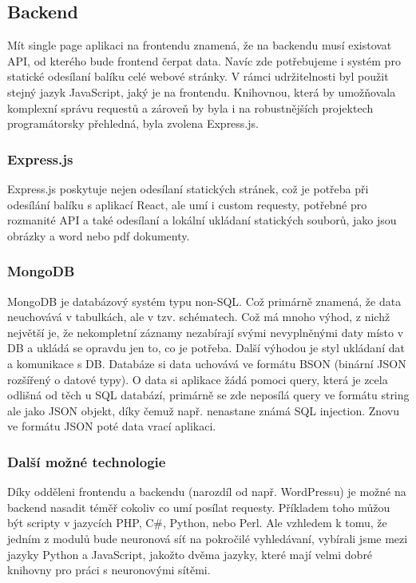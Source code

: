 \subsection{Backend}
Mít single page aplikaci na frontendu znamená, že na backendu musí existovat API,
od kterého bude frontend čerpat data.
Navíc zde potřebujeme i systém pro statické odesílaní balíku celé webové stránky.
V rámci udržitelnosti byl použit stejný jazyk JavaScript, jaký je na frontendu.
Knihovnou, která by umožňovala komplexní správu requestů a zároveň by byla
i na robustnějších projektech programátorsky přehledná, byla zvolena Express.js.

\subsubsection{Express.js}
Express.js poskytuje nejen odesílaní statických stránek,
což je potřeba při odesílání balíku s aplikací React, ale umí i
custom requesty, potřebné pro rozmanité API a také odesílaní a
lokální ukládaní statických souborů, jako jsou obrázky a word nebo pdf dokumenty.

\subsubsection{MongoDB}
MongoDB je databázový systém typu non-SQL.
Což primárně znamená, že data neuchovává v tabulkách, ale v tzv. schématech.
Což má mnoho výhod, z nichž největší je, že nekompletní záznamy nezabírají
svými nevyplněnými daty místo v DB a ukládá se opravdu jen to, co je potřeba.
Další výhodou je styl ukládaní dat a komunikace s DB.
Databáze si data uchovává ve formátu BSON (binární JSON rozšířený o datové typy).
O data si aplikace žádá pomoci query,
která je zcela odlišná od těch u SQL databází,
primárně se zde neposílá query ve formátu string ale jako JSON objekt,
díky čemuž např. nenastane známá SQL injection.
Znovu ve formátu JSON poté data vrací aplikaci.

\subsubsection{Další možné technologie}
Díky odděleni frontendu a backendu (narozdíl od např. WordPressu) je možné
na backend nasadit téměř cokoliv co umí posílat requesty.
Příkladem toho můžou být scripty v jazycích PHP, C\#, Python, nebo Perl.
Ale vzhledem k tomu, že jedním z modulů bude neuronová síť na pokročilé vyhledávaní,
vybírali jsme mezi jazyky Python a JavaScript, jakožto dvěma jazyky, které
mají velmi dobré knihovny pro práci s neuronovými sítěmi.

